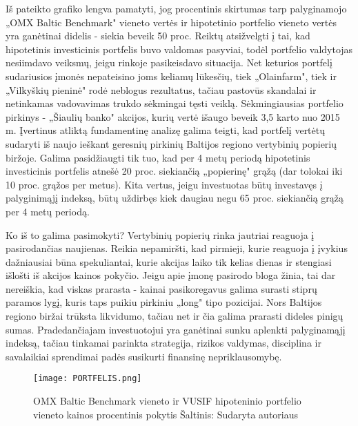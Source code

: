 \documentclass[titlepage, 11pt]{article}
\begin{document}
Iš pateikto grafiko lengva pamatyti, jog procentinis skirtumas tarp palyginamojo „OMX Baltic Benchmark" vieneto vertės ir hipotetinio portfelio vieneto vertės yra ganėtinai didelis - siekia beveik 50 proc. Reiktų atsižvelgti į tai, kad hipotetinis investicinis portfelis buvo valdomas pasyviai, todėl portfelio valdytojas nesiimdavo veiksmų, jeigu rinkoje pasikeisdavo situacija. Net keturios portfelį sudariusios įmonės nepateisino joms keliamų lūkesčių, tiek  „Olainfarm", tiek ir „Vilkyškių pieninė" rodė neblogus rezultatus, tačiau pastovūs skandalai ir netinkamas vadovavimas trukdo sėkmingai tęsti veiklą. Sėkmingiausias portfelio pirkinys -  „Šiaulių banko" akcijos, kurių vertė išaugo beveik 3,5 karto nuo 2015 m.
Įvertinus atliktą fundamentinę analizę galima teigti, kad portfelį vertėtų sudaryti iš naujo ieškant geresnių pirkinių Baltijos regiono vertybinių popierių biržoje. Galima pasidžiaugti tik tuo, kad per 4 metų periodą hipotetinis investicinis portfelis atnešė 20 proc. siekiančią  „popierinę" grąžą (dar tolokai iki 10 proc. grąžos per metus). Kita vertus, jeigu investuotas būtų investavęs į palyginimąjį indeksą, būtų uždirbęs kiek daugiau negu 65 proc. siekiančią grąžą per 4 metų periodą.

Ko iš to galima pasimokyti? Vertybinių popierių rinka jautriai reaguoja į pasirodančias naujienas. Reikia nepamiršti, kad pirmieji, kurie reaguoja į įvykius dažniausiai būna spekuliantai, kurie akcijas laiko tik kelias dienas ir stengiasi išlošti iš akcijos kainos pokyčio. Jeigu apie įmonę pasirodo bloga žinia, tai dar nereiškia, kad viskas prarasta - kainai pasikoregavus galima surasti stiprų paramos lygį, kuris taps puikiu pirkiniu „long" tipo pozicijai. Nors Baltijos regiono biržai trūksta likvidumo, tačiau net ir čia galima prarasti dideles pinigų sumas. Pradedančiajam investuotojui yra ganėtinai sunku aplenkti palyginamąjį indeksą, tačiau tinkamai parinkta strategija, rizikos valdymas, disciplina ir savalaikiai sprendimai padės susikurti finansinę nepriklausomybę.

\begin{figure}[H]
\captionsetup{justification=centering}
\center
\texttt{[image: PORTFELIS.png]}
\caption{OMX Baltic Benchmark vieneto ir VUSIF hipoteninio portfelio vieneto kainos procentinis pokytis \newline
Šaltinis: Sudaryta autoriaus}
\end{figure}
\end{document}
